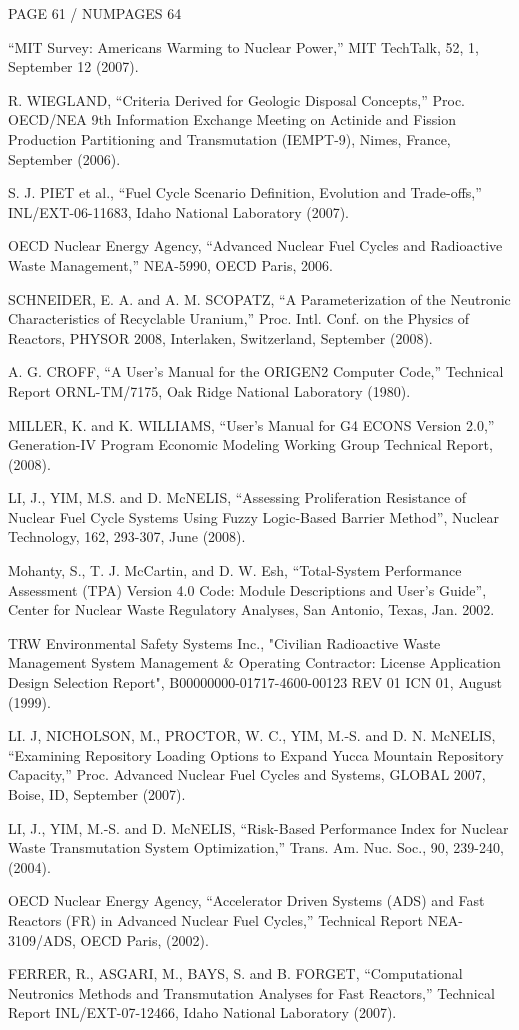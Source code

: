   PAGE  61 /  NUMPAGES  64 

 ``MIT Survey: Americans Warming to Nuclear Power,'' MIT TechTalk, 52,
1, September 12 (2007).

 R. WIEGLAND, ``Criteria Derived for Geologic Disposal Concepts,'' Proc.
OECD/NEA 9th Information Exchange Meeting on Actinide and Fission
Production Partitioning and Transmutation (IEMPT-9), Nimes, France,
September (2006).

 S. J. PIET et al., ``Fuel Cycle Scenario Definition, Evolution and
Trade-offs,'' INL/EXT-06-11683, Idaho National Laboratory (2007).

 OECD Nuclear Energy Agency, ``Advanced Nuclear Fuel Cycles and
Radioactive Waste Management,'' NEA-5990, OECD Paris, 2006.

 SCHNEIDER, E. A. and A. M. SCOPATZ, ``A Parameterization of the
Neutronic Characteristics of Recyclable Uranium,'' Proc. Intl. Conf. on
the Physics of Reactors, PHYSOR 2008, Interlaken, Switzerland, September
(2008).

 A. G. CROFF, ``A User's Manual for the ORIGEN2 Computer Code,''
Technical Report ORNL-TM/7175, Oak Ridge National Laboratory (1980).

 MILLER, K. and K. WILLIAMS, ``User's Manual for G4 ECONS Version 2.0,''
Generation-IV Program Economic Modeling Working Group Technical Report,
(2008).

 LI, J., YIM, M.S. and D. McNELIS, ``Assessing Proliferation Resistance
of Nuclear Fuel Cycle Systems Using Fuzzy Logic-Based Barrier Method'',
Nuclear Technology, 162, 293-307, June (2008).

 Mohanty, S., T. J. McCartin, and D. W. Esh, ``Total-System Performance
Assessment (TPA) Version 4.0 Code: Module Descriptions and User's
Guide'', Center for Nuclear Waste Regulatory Analyses, San Antonio,
Texas, Jan. 2002.

 TRW Environmental Safety Systems Inc., "Civilian Radioactive Waste
Management System Management \& Operating Contractor: License
Application Design Selection Report", B00000000-01717-4600-00123 REV 01
ICN 01, August (1999).

 LI. J, NICHOLSON, M., PROCTOR, W. C., YIM, M.-S. and D. N. McNELIS,
``Examining Repository Loading Options to Expand Yucca Mountain
Repository Capacity,'' Proc. Advanced Nuclear Fuel Cycles and Systems,
GLOBAL 2007, Boise, ID, September (2007). 

 LI, J., YIM, M.-S. and D. McNELIS, ``Risk-Based Performance Index for
Nuclear Waste Transmutation System Optimization,'' Trans. Am. Nuc. Soc.,
90, 239-240, (2004).

 OECD Nuclear Energy Agency, ``Accelerator Driven Systems (ADS) and Fast
Reactors (FR) in Advanced Nuclear Fuel Cycles,'' Technical Report
NEA-3109/ADS, OECD Paris, (2002).

 FERRER, R., ASGARI, M., BAYS, S. and B. FORGET, ``Computational
Neutronics Methods and Transmutation Analyses for Fast Reactors,''
Technical Report INL/EXT-07-12466, Idaho National Laboratory (2007).

